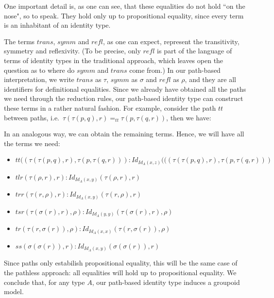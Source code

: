 \documentclass{entcs} \usepackage{entcsmacro}
\begin{document}
One important detail is, as one can see, that these equalities do not hold ``on the nose", so to speak. They hold only up to propositional equality, since every term is an inhabitant of an identity type. 

The terms $trans$, $symm$ and $refl$, as one can expect, represent the transitivity, symmetry and reflexivity. (To be precise, only $refl$ is part of the language of terms of identity types in the traditional approach, which leaves open the question as to where do $symm$ and $trans$ come from.) In our path-based interpretation, we write $trans$ as $\tau$, $symm$ as $\sigma$ and $refl$ as $\rho$, and they are all identifiers for definitional equalities. Since we already have obtained all the paths we need through the reduction rules, our path-based identity type can construct these terms in a rather natural fashion. For example, consider the path $tt$ between paths, i.e.\ $\tau(\tau(p,q),r) =_{tt} \tau(p, \tau(q,r))$, then we have:

\bigskip
\begin{center}
\begin{bprooftree}
\end{bprooftree}
\end{center}
\bigskip

In an analogous way, we can obtain the remaining terms. Hence, we will have all the terms we need:

\begin{itemize}

\item $tt((\tau(\tau(p,q),r), \tau(p, \tau(q,r))) : Id_{Id_{A}(x,z)}(((\tau(\tau(p,q),r), \tau(p, \tau(q,r)))$
\item $tlr (\tau(\rho,r), r) : Id_{Id_{A}(x,y)}(\tau(\rho,r), r)$
\item $trr (\tau(r,\rho), r) : Id_{Id_{A}(x,y)}(\tau(r,\rho), r)$
\item $tsr (\tau(\sigma(r),r), \rho) : Id_{Id_{A}(y,y)}(\tau(\sigma(r),r), \rho)$
\item $tr (\tau(r,\sigma(r)), \rho) : Id_{Id_{A}(x,x)}(\tau(r,\sigma(r)), \rho)$
\item $ss (\sigma(\sigma(r)),r) : Id_{Id_{A}(x,y)}(\sigma(\sigma(r)),r)$
\end{itemize}

Since paths only estabilish propositional equality, this will be the same case of the pathless approach: all equalities will hold up to propositional equality. We conclude that, for any type $A$, our path-based identity type induces a groupoid model.
\end{document}
